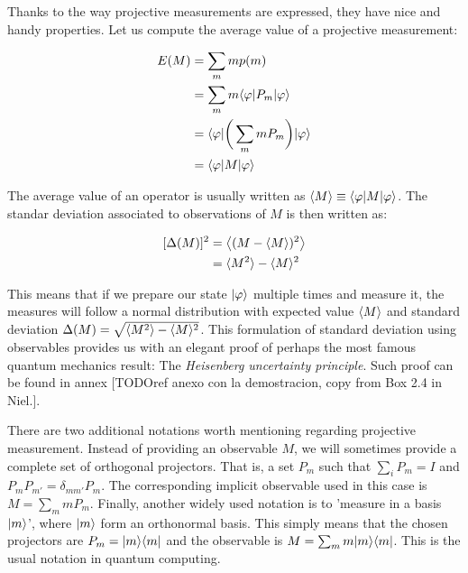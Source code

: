Thanks to the way projective measurements are expressed, they have nice and handy properties. Let us compute the average value of a projective measurement:

\begin{equation}
	\begin{split}
		E(M)	& = \sum_m m p(m) \\
				& = \sum_m m \langle \varphi | P_m | \varphi \rangle \\
				& = \langle \varphi | \bigg( \sum_m m P_m \bigg) | \varphi \rangle \\
				& = \langle \varphi | M | \varphi \rangle
	\end{split}
\end{equation}

The average value of an operator is usually written as $\langle M \rangle \equiv \langle \varphi | M | \varphi \rangle$. The standar deviation associated to observations of $M$ is then written as:

\begin{equation}
	\begin{split}
	[\Delta(M)]^2	& = \big\langle (M - \langle M \rangle )^2 \big\rangle\\
					& = \langle M^2 \rangle - \langle M \rangle^2
	\end{split}
\end{equation}

This means that if we prepare our state $|\varphi\rangle$ multiple times and measure it, the measures will follow a normal distribution with expected value $\langle M \rangle$ and standard deviation $\Delta(M) = \sqrt{\langle M^2 \rangle - \langle M \rangle^2}$. This formulation of standard deviation using observables provides us with an elegant proof of perhaps the most famous quantum mechanics result: The \emph{Heisenberg uncertainty principle}. Such proof can be found in annex [TODOref anexo con la demostracion, copy from Box 2.4 in Niel.].

There are two additional notations worth mentioning regarding projective measurement. Instead of providing an observable $M$, we will sometimes provide a complete set of orthogonal projectors. That is, a set $P_m$ such that $\sum_i P_m = I$ and $P_m P_{m'} = \delta_{mm'} P_m$. The corresponding implicit observable used in this case is $M = \sum_m m P_m$. Finally, another widely used notation is to 'measure in a basis $|m\rangle$', where $|m\rangle$ form an orthonormal basis. This simply means that the chosen projectors are  $P_m = |m \rangle\langle m|$ and the observable is $M = \sum_m m |m \rangle\langle m|$. This is the usual notation in quantum computing.



